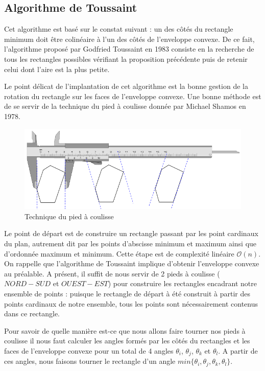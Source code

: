 \subsection{Algorithme de Toussaint}
Cet algorithme est basé sur le constat suivant : un des côtés du rectangle minimum doit être colinéaire à l'un des côtés de l'enveloppe convexe. De ce fait, l'algorithme proposé par Godfried Toussaint en 1983 consiste en la recherche de tous les rectangles possibles vérifiant la proposition précédente puis de retenir celui dont l'aire est la plus petite.

Le point délicat de l'implantation de cet algorithme est la bonne gestion de la rotation du rectangle sur les faces de l'enveloppe convexe. Une bonne méthode est de se servir de la technique du \og pied à coulisse \fg{} donnée par Michael Shamos en 1978.

\begin{figure}[ht]
\begin{center}
\includegraphics[scale=0.6]{images/shamos.png}
\caption{Technique du pied à coulisse}
\end{center}
\end{figure}

Le point de départ est de construire un rectangle passant par les point cardinaux du plan, autrement dit par les points d'abscisse minimum et maximum ainsi que d'ordonnée maximum et minimum. Cette étape est de complexité linéaire $\mathcal{O}(n)$. On rappelle que l'algorithme de Toussaint implique d'obtenir l'enveloppe convexe au préalable.
A présent, il suffit de nous servir de 2 pieds à coulisse ($NORD-SUD$ et $OUEST-EST$) pour construire les rectangles encadrant notre ensemble de points : puisque le rectangle de départ à été construit à partir des points cardinaux de notre ensemble, tous les points sont nécessairement contenus dans ce rectangle.

Pour savoir de quelle manière est-ce que nous allons faire tourner nos pieds à coulisse il nous faut calculer les angles formés par les côtés du rectangles et les faces de l'enveloppe convexe pour un total de 4 angles $\theta _i$, $\theta _j$, $\theta _k$ et $\theta _l$. A partir de ces angles, nous faisons tourner le rectangle d'un angle $min\{\theta _i, \theta _j, \theta _k, \theta _l\}$.

